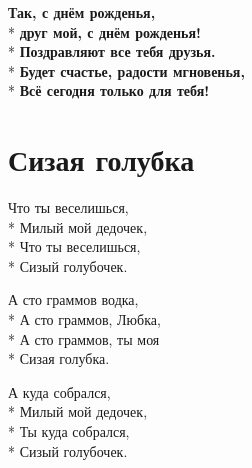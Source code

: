 \medskip

\begin{minipage}{\linewidth}
\hspace*{1.5em}\textbf{Так, с днём рожденья,}\\*
\hspace*{1.5em}\textbf{друг мой, с днём рожденья!}\\*
\hspace*{1.5em}\textbf{Поздравляют все тебя друзья.}\\*
\hspace*{1.5em}\textbf{Будет счастье, радости мгновенья,}\\*
\hspace*{1.5em}\textbf{Всё сегодня только для тебя!}\\
\end{minipage}

\vspace{\fill}\newpage

\section{Сизая голубка}
\label{song:Сизая_голубка}

\medskip

\begin{minipage}{\linewidth}
Что ты веселишься,\\*
Милый мой дедочек,\\*
Что ты веселишься,\\*
Сизый голубочек.\\
\end{minipage}\par\medskip\nobreak

\medskip

\begin{minipage}{\linewidth}
\hspace*{1.5em}А сто граммов водка,\\*
\hspace*{1.5em}А сто граммов, Любка,\\*
\hspace*{1.5em}А сто граммов, ты моя\\*
\hspace*{1.5em}Сизая голубка.\\
\end{minipage}\par\medskip\nobreak

\medskip

\begin{minipage}{\linewidth}
А куда собрался,\\*
Милый мой дедочек,\\*
Ты куда собрался,\\*
Сизый голубочек.\\
\end{minipage}\par\medskip\nobreak


